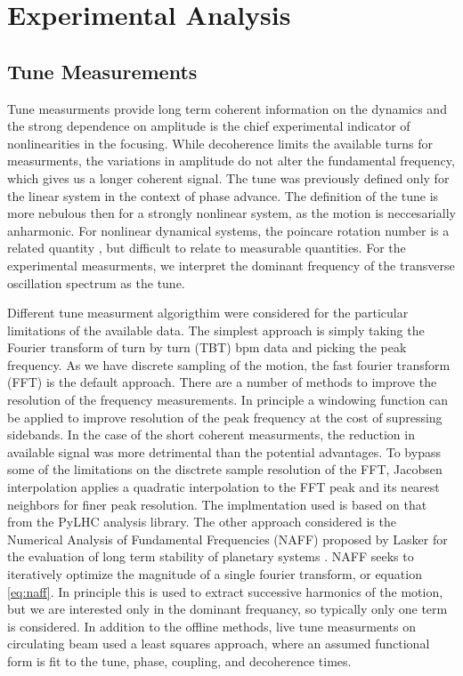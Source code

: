 \chapter{Experimental Analysis} \label{chap:analysis}


\section{Tune Measurements} \label{sec:tune}
Tune measurments provide long term coherent information on the dynamics and the strong dependence on amplitude is the chief experimental indicator of nonlinearities in the focusing. While decoherence limits the available turns for measurments, the variations in amplitude do not alter the fundamental frequency, which gives us a longer coherent signal. The tune was previously defined only for the linear system in the context of phase advance. The definition of the tune is more nebulous then for a strongly nonlinear system, as the motion is neccesarially anharmonic. For nonlinear dynamical systems, the poincare rotation number is a related quantity \cite{nagaitsevBetatron}, but difficult to relate to measurable quantities. For the experimental measurments, we interpret the dominant frequency of the transverse oscillation spectrum as the tune. 

Different tune measurment algorigthim were considered for the particular limitations of the available data. The simplest approach is simply taking the Fourier transform of turn by turn (TBT) bpm data and picking the peak frequency. As we have discrete sampling of the motion, the fast fourier transform (FFT) is the default approach. There are a number of methods to improve the resolution of the frequency measurements. In principle a windowing function can be applied to improve resolution of the peak frequency at the cost of supressing sidebands. In the case of the short coherent measurments, the reduction in available signal was more detrimental than the potential advantages. To bypass some of the limitations on the disctrete sample resolution of the FFT, Jacobsen interpolation \cite{jacobesnLocla} applies a quadratic interpolation to the FFT peak and its nearest neighbors for finer peak resolution. The implmentation used is based on that from the PyLHC \cite{cernomc} analysis library. The other approach considered is the Numerical Analysis of Fundamental Frequencies (NAFF) proposed by Lasker for the evaluation of long term stability of planetary systems \cite{laskar}. NAFF seeks to iteratively optimize the magnitude of a single fourier transform, or equation \ref{eq:naff}. In principle this is used to extract successive harmonics of the motion, but we are interested only in the dominant frequancy, so typically only one term is considered. In addition to the offline methods, live tune measurments on circulating beam used a least squares approach, where an assumed functional form is fit to the tune, phase, coupling, and decoherence times.

